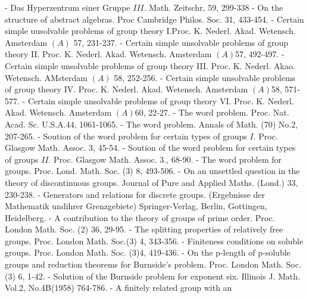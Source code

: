 \begin{thebibliography}{99}
 - Das Hyperzentrum einer Gruppe
  $III$. Math. Zeitschr, 59, 299-338 
- On the structure of abstract
  algebras. Proc Cambridge Philos. Soc. 31, 433-454. 
- Certain simple uusolvable
  problems of group theory
  I.Proc. K. Nederl. Akad. Wetensch. Amsterdam $(A)$ 57, 231-237. 
- Certain simple unsolvable problems of group
  theory II. Proc. K. Nederl. Akad. Wetensch. Amsterdam $(A)$57,
  492-497. 
- Certain simple unsolvable problems of group
  theory III. Proc. K. Nederl. Akao. Wetensch. AMsterdam $(A)$ 58,
  252-256. 
- Certain simple unsolvable problems of group
  theory IV. Proc. K. Nederl. Akad. Wetensch. Amsterdam $(A)$58,
  571-577. 
- Certain simple unsolvable problems of group
  theory VI. Proc. K. Nederl. Akad. Wetensch. Amsterdam $(A)$60,
  22-27. 
- The word
  problem. Proc. Nat. Acad. Sc. U.S.A.44, 1061-1065. 
- The word problem. Annals of Math. (70) No.2,
  207-265. 
- Soution of the word problem for
  certain types of groups $I$. Proc. Glasgow Math. Assoc. 3, 45-54. 
- Soution of the word problem for certain types
  of groups $II$. Proc. Glasgow Math. Assoc. 3., 68-90. 
 - The word problem for
  groups. Proc. Lond. Math. Soc. (3) 8, 493-506. 
 - On an unsettled question in the
  theory of discontinuous groups. Journal of Pure and Applied
  Maths. (Lond.) 33, 230-238. 
 - Generators and
  relations for discrete groups. (Ergebnisse der Mathematik undihrer
  Grenzgebiete) Springer-Verlag, Berlin, Gottingen, Heidelberg. 
 - A contribution to the theory of groups
  of prime order. Proc. London Math. Soc. (2) 36, 29-95. 
 - The splitting properties of relatively
  free groups. Proc. London Math. Soc.(3) 4, 343-356. 
 - Finiteness conditions on soluble
  groups. Proc. London Math. Soc. (3)4, 419-436. 
- On the p-length of
  p-soluble groups and reduction theorems for Burnside's
  problem. Proc. London Math. Soc. (3) 6, 1-42. 
- Solution of the Burnside problem
  for exponent six. Illinois J. Math. Vol.2, No.4B(1958) 764-786. 
- A finitely related group with an

\end{thebibliography}
